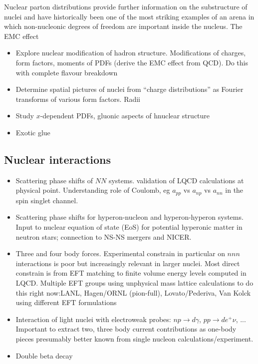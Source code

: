 Nuclear parton distributions provide further information on the substructure of nuclei and have historically been one of the 
most striking examples of an arena in which non-nucleonic degrees of freedom are important inside the nucleus. The EMC effect \cite{Aubert:1983XX}  

\begin{itemize}
	\item Explore nuclear modification of hadron structure. Modifications of charges, form factors, moments of PDFs  (derive the EMC effect from QCD). 
	Do this with complete flavour breakdown
	\item Determine spatial pictures of nuclei from ``charge distributions'' as Fourier transforms of various form factors. Radii
	\item Study $x$-dependent PDFs, gluonic aspects of hnuclear structure
	\item Exotic glue
\end{itemize}





\subsection{Nuclear interactions}

\begin{itemize}
	\item Scattering  phase shifts of $NN$ systems. validation of LQCD calculations at physical point. Understanding role of Coulomb, eg $a_{pp}$ vs $a_{np}$ vs $a_{nn}$ in the spin singlet channel.
	\item Scattering phase shifts for  hyperon-nucleon and hyperon-hyperon systems. Input to nuclear equation of state (EoS) for potential hyperonic matter in neutron stars; connection to NS-NS mergers and NICER.
	\item Three and four body forces. Experimental constrain in particular on $nnn$ interactions is poor but increasingly relevant in larger nuclei. Most direct constrain is from EFT matching to finite volume energy levels computed in LQCD. Multiple EFT groups using unphysical mass lattice calculations to do this right now:LANL, Hagen/ORNL (pion-full), Lovato/Pederiva, Van Kolck using different EFT formulations
	\item Interaction of light nuclei with electroweak probes: $np\to d\gamma$, $pp\to de^+\nu$, ... 
	Important to extract two, three body current contributions as one-body pieces presumably better known from single nucleon calculations/experiment.
	\item Double beta decay
\end{itemize}

